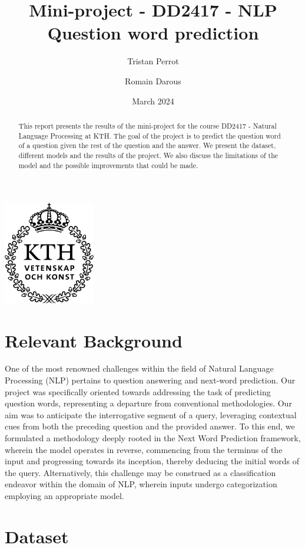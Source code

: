 \documentclass{article}
\title{Mini-project - DD2417 - NLP \\ Question word prediction}
\author{Tristan Perrot \and Romain Darous}
\date{March 2024}
\begin{document}
\maketitle
\begin{center}
    \includegraphics[width = 40mm]{images/KTH_logo_RGB_svart.png}
\end{center}

\begin{abstract}
    This report presents the results of the mini-project for the course DD2417 - Natural Language Processing at KTH. The goal of the project is to predict the question word of a question given the rest of the question and the answer. We present the dataset, different models and the results of the project. We also discuss the limitations of the model and the possible improvements that could be made.
\end{abstract}

\section{Relevant Background}

One of the most renowned challenges within the field of Natural Language Processing (NLP) pertains to question answering and next-word prediction. Our project was specifically oriented towards addressing the task of predicting question words, representing a departure from conventional methodologies. Our aim was to anticipate the interrogative segment of a query, leveraging contextual cues from both the preceding question and the provided answer. To this end, we formulated a methodology deeply rooted in the Next Word Prediction framework, wherein the model operates in reverse, commencing from the terminus of the input and progressing towards its inception, thereby deducing the initial words of the query. Alternatively, this challenge may be construed as a classification endeavor within the domain of NLP, wherein inputs undergo categorization employing an appropriate model.

\section{Dataset}
\end{document}
